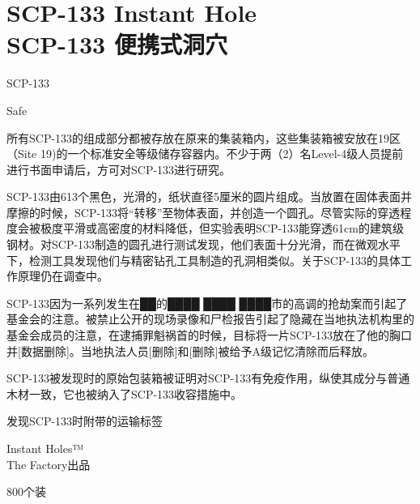 \chapter[SCP-133 便携式洞穴]{
    SCP-133 Instant Hole\\
    SCP-133 便携式洞穴
}

\label{chap:SCP-133}

SCP-133

Safe

所有SCP-133的组成部分都被存放在原来的集装箱内，这些集装箱被安放在19区（Site 19)的一个标准安全等级储存容器内。不少于两（2）名Level-4级人员提前进行书面申请后，方可对SCP-133进行研究。

SCP-133由613个黑色，光滑的，纸状直径5厘米的圆片组成。当放置在固体表面并摩擦的时候，SCP-133将“转移”至物体表面，并创造一个圆孔。尽管实际的穿透程度会被极度平滑或高密度的材料降低，但实验表明SCP-133能穿透61cm的建筑级钢材。对SCP-133制造的圆孔进行测试发现，他们表面十分光滑，而在微观水平下，检测工具发现他们与精密钻孔工具制造的孔洞相类似。关于SCP-133的具体工作原理仍在调查中。

SCP-133因为一系列发生在██的████ ████ ████市的高调的抢劫案而引起了基金会的注意。被禁止公开的现场录像和尸检报告引起了隐藏在当地执法机构里的基金会成员的注意，在逮捕罪魁祸首的时候，目标将一片SCP-133放在了他的胸口并{[}数据删除]。当地执法人员{[}删除]和{[}删除]被给予A级记忆清除而后释放。

SCP-133被发现时的原始包装箱被证明对SCP-133有免疫作用，纵使其成分与普通木材一致，它也被纳入了SCP-133收容措施中。

发现SCP-133时附带的运输标签

\begin{scpbox}

Instant Holes™\\
The Factory出品

800个装

\end{scpbox}
